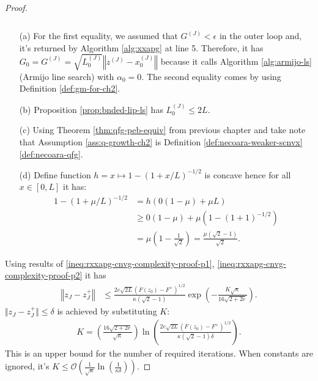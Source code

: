 \documentclass[12pt]{report}
\begin{document}
\begin{proof}
{\begin{align}
\begin{split}
                \end{split}
                \label{ineq:rxxapg-cnvg-complexity-proof-p2}
            \end{align}
            }
            \begin{enumerate}
                \item [(a)] For the first equality, we assumed that $G^{(J)} < \epsilon$ in the outer loop and, it's returned by Algorithm \ref{alg:xxapg} at line 5. Therefore, it has $G_0 = G^{(J)} = \sqrt{L^{(J)}_0} \left\Vert z^{(J)} - x_0^{(J)}\right\Vert$ because it calls Algorithm \ref{alg:armijo-ls} (Armijo line search) with $\alpha_0 = 0$. The second equality comes by using Definition \ref{def:gm-for-ch2}. 
                \item [(b)] Proposition \ref{prop:bnded-lip-ls} has $L_0^{(J)} \le 2L$. 
                \item [(c)] Using Theorem \ref{thm:qfg-peb-equiv} from previous chapter and take note that Assumption \ref{ass:q-growth-ch2} is Definition \ref{def:necoara-weaker-scnvx}\ref{def:necoara-qfg}. 
                \item [(d)] Define function $h = x \mapsto 1 - (1 + x/L)^{-1/2}$ is concave hence for all $x \in [0, L]$ it has: 
                \begin{align*}
                    1 - (1 + \mu/L)^{-1/2} &= h(0(1 - \mu) + \mu L)
                    \\
                    &\ge 0(1 - \mu) + \mu\left(1 - (1 + 1)^{-1/2}\right) 
                    \\
                    &= \mu\left(
                        1 - \frac{1}{\sqrt{2}}
                    \right) = \frac{\mu(\sqrt{2} - 1)}{\sqrt{2}}. 
                \end{align*}
            \end{enumerate}
            Using results of \eqref{ineq:rxxapg-cnvg-complexity-proof-p1}, \eqref{ineq:rxxapg-cnvg-complexity-proof-p2} it has
            \begin{align*}
                \left\Vert z_J - z^+_J\right\Vert 
                &\le 
                \frac{2e\sqrt{2L}(F(z_0) - F^+)^{1/2}}{\kappa(\sqrt{2} - 1)} 
                \exp\left(
                    -\frac{K\sqrt{\kappa}}{16\sqrt{2 + 2e}}
                \right). 
            \end{align*}
            $\Vert z_J - z^+_J\Vert \le \delta$ is achieved by substituting $K$: 
            \begin{align*}
                K = \left(
                    \frac{16\sqrt{2 + 2e}}{\sqrt{\kappa}}
                \right)
                \ln \left(
                    \frac{2e\sqrt{2L}(F(z_0) - F^+)^{1/2}}{\kappa(\sqrt{2} - 1)\delta} 
                \right). 
            \end{align*}
            This is an upper bound for the number of required iterations. 
            When constants are ignored, it's $K \le \mathcal O\left(\frac{1}{\sqrt{\kappa}}\ln\left(\frac{1}{\kappa\delta}\right)\right)$. 
        \end{proof}
\end{document}
